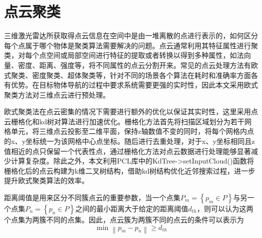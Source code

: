 \section{点云聚类}
三维激光雷达所获取得点云信息在空间中是由一堆离散的点进行表示的，如何区分每个点属于哪个物体是聚类算法需要解决的问题。点云通常利用其特征属性进行聚类，对每个点空间或局部空间进行特征的提取或者转换以得到多种属性，如法向量、密度、距离、强度等，将不同属性的点云分割开来\cite{himmelsbach2010fast}。常见的点云处理方法有欧式聚类、密度聚类、超体聚类等，针对不同的场景各个算法在耗时和准确率方面各有优势。在目标物体导航的过程中要求系统需要更强的实时性，因此本文采用欧式聚类\cite{liu2021point}方法对三维点云进行预处理。

欧式聚类法在点云密集的情况下需要进行额外的优化以保证其实时性，这里采用点云栅格化和kd树对算法进行加速优化\cite{guo2023kd}。栅格化方法首先将扫描区域划分为若干网格单元，将三维点云投影至二维平面，保持z轴数值不变的同时，将每个网格内点的x、y坐标统一为该网格中心点坐标。随后进行去重处理，对于x、y坐标相同且z值相近的点只保留一个代表性点，通过栅格化方法对点云数据进行处理能够显著减少计算复杂度。除此之外，本文利用PCL库中的KdTree->setInputCloud()函数将栅格化后的点云构建为k维二叉树结构，借助kd树结构优化近邻搜索过程，进一步提升欧式聚类算法的效率。

距离阈值是用来区分不同簇点云的重要参数，当一个点集${P_m} = \left\{ {{p_m} \in P} \right\}$与另一个点集${P_n} = \left\{ {{p_n} \in P} \right\}$之间的最小距离大于给定的距离阈值${d_{th}}$，则可以认为这两个点集为两簇不同的点集。因此，点云簇为两簇不同的点云的条件可以表示为
\begin{equation}
    \min \left\| {{p_m} - {p_n}} \right\| \ge {d_{th}}
    \label{myeq5}
\end{equation}

